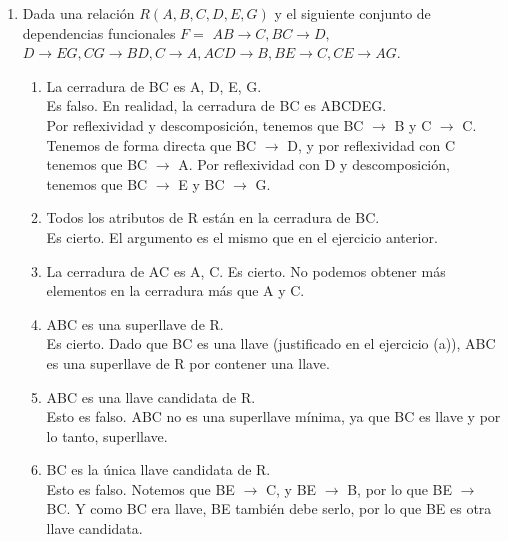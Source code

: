 \documentclass{article}
\begin{document}
\begin{enumerate}
\begin{enumerate}
        \item Si AB $\rightarrow$ C, entonces A $\rightarrow$ C y B $\rightarrow$ C.\\
        Consideremos la siguiente tabla:\\
        A     B     C\\
        a1    b1    c1\\
        a2    b1    c2\\
        Tenemos que AB $\rightarrow$ C, pero no es cierto que B $\rightarrow$ C.
        \item Si AB $\rightarrow$ C y A $\rightarrow$ C, entonces B $\rightarrow$ C.\\
        Consideremos la table del ejemplo anterior. En ella, AB $\rightarrow$ C y A $\rightarrow$ C, pero no es cierto que B $\rightarrow$ C.
    \end{enumerate}

    \item Dada una relación $R (A, B, C, D, E, G)$ y el siguiente conjunto de dependencias funcionales $F=${ $AB\rightarrow C, BC \rightarrow D,$\\$ D \rightarrow EG, CG \rightarrow BD, C \rightarrow A, ACD \rightarrow B, BE \rightarrow C, CE \rightarrow AG$}.
    \begin{enumerate}
        \item La cerradura de BC es {A, D, E, G}.\\
        Es falso. En realidad, la cerradura de BC es ABCDEG.\\
        Por reflexividad y descomposición, tenemos que BC $\rightarrow$ B y C $\rightarrow$ C. Tenemos de forma directa que BC $\rightarrow$ D, y por reflexividad con C tenemos que BC $\rightarrow$ A. Por reflexividad con D y descomposición, tenemos que BC $\rightarrow$ E y BC $\rightarrow$ G.
        \item Todos los atributos de R están en la cerradura de BC.\\
        Es cierto. El argumento es el mismo que en el ejercicio anterior.
        \item La cerradura de AC es {A, C}. Es cierto. No podemos obtener más elementos en la cerradura más que A y C.
        \item ABC es una superllave de R.
        \\ Es cierto. Dado que BC es una llave (justificado en el ejercicio (a)), ABC es una superllave de R por contener una llave.
        \item ABC es una llave candidata de R.
        \\Esto es falso. ABC no es una superllave mínima, ya que BC es llave y por lo tanto, superllave.
        \item BC es la única llave candidata de R.\\
        Esto es falso. Notemos que BE $\rightarrow$ C, y BE $\rightarrow$ B, por lo que BE $\rightarrow$ BC. Y como BC era llave, BE también debe serlo, por lo que BE es otra llave candidata.
    \end{enumerate}
    

\end{enumerate}
\end{document}
